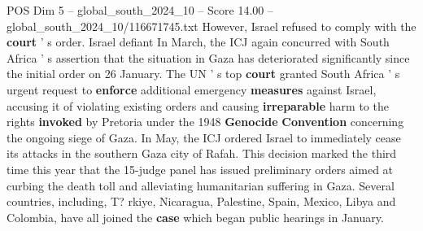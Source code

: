 \begin{textsample}{POS Dim 5 – global\_south\_2024\_10 – Score 14.00 – global\_south\_2024\_10/116671745.txt}
However, Israel refused to comply with the \textbf{court} ' s order.
Israel defiant In March, the ICJ again concurred with South Africa ' s assertion that the situation in Gaza has deteriorated significantly since the initial order on 26 January.
The UN ' s top \textbf{court} granted South Africa ' s urgent request to \textbf{enforce} additional emergency \textbf{measures} against Israel, accusing it of violating existing orders and causing \textbf{irreparable} harm to the rights \textbf{invoked} by Pretoria under the 1948 \textbf{Genocide} \textbf{Convention} concerning the ongoing siege of Gaza.
In May, the ICJ ordered Israel to immediately cease its attacks in the southern Gaza city of Rafah.
This decision marked the third time this year that the 15-judge panel has issued preliminary orders aimed at curbing the death toll and alleviating humanitarian suffering in Gaza.
Several countries, including, T? rkiye, Nicaragua, Palestine, Spain, Mexico, Libya and Colombia, have all joined the \textbf{case} which began public hearings in January.

\end{textsample}
